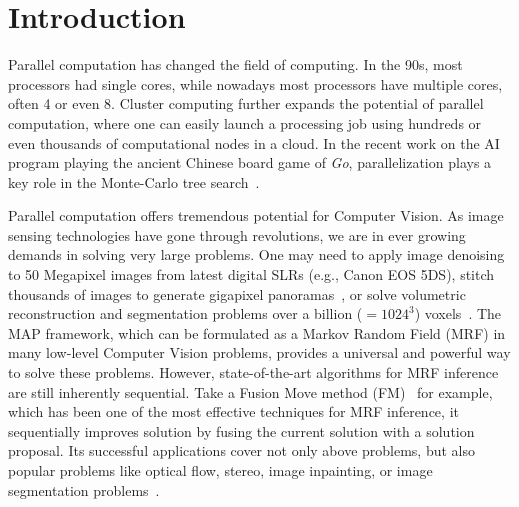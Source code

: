 \section{Introduction}

Parallel computation has changed the field of computing.  In the 90s,
most processors had single cores, while nowadays most processors have
multiple cores, often 4 or even 8. Cluster computing further expands
the potential of parallel computation, where one can easily launch a
processing job using hundreds or even thousands of computational nodes
in a cloud.
%
In the recent work on the AI program playing the ancient Chinese board
game of {\it Go}, parallelization plays a key role in the Monte-Carlo
tree search~\cite{silver2016mastering}.


Parallel computation offers tremendous potential for Computer Vision. As
image sensing technologies have gone through revolutions, we are in
ever growing demands in solving very large problems. One may need to
apply image denoising to 50 Megapixel images from latest digital
SLRs (e.g., Canon EOS 5DS), stitch thousands of images to generate gigapixel
panoramas~\cite{kopf2007capturing}, or solve volumetric reconstruction and
segmentation problems over a billion ($=1024^3$)
voxels~\cite{hane2013joint}.
%
%
The MAP framework, which can be formulated as a Markov Random Field
(MRF) in many low-level Computer Vision problems, provides a universal
and powerful way to solve these problems. However, state-of-the-art
algorithms for MRF inference are still inherently sequential. Take a
Fusion Move method
(FM)~\cite{fusion_flow,fusion_moves_for_markov_random_field_optimization,second_order_stereo}
for example, which has been one of the most effective techniques for
MRF inference, it sequentially improves solution by fusing the current solution with
a solution proposal. Its successful applications cover not only above
problems, but also popular problems like optical flow, stereo, image
inpainting, or image segmentation
problems~\cite{fusion_moves_for_markov_random_field_optimization}.


